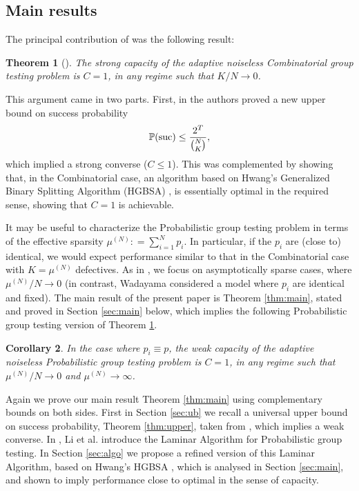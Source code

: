 \documentclass[conference]{IEEEtran}
\newtheorem{theorem}{Theorem}[section]
\newtheorem{corollary}[theorem]{Corollary}
\newcommand{\pr}{{\mathbb{P}}}
\newcommand{\suc}{{\rm suc}}
\begin{document}
\subsection{Main results}

The principal contribution of \cite[Theorem 1.2]{johnsonc10} was the following result:
%
\begin{theorem}[\cite{johnsonc10}] \label{thm:mainold}
The strong capacity of the adaptive noiseless Combinatorial group testing problem
  is  $C = 1$,
  in any regime such that $K/N \rightarrow 0$.
\end{theorem}
%
This argument came in two parts. First, in \cite[Theorem 3.1]{johnsonc10} the authors  proved a new
upper bound on success probability 
\begin{equation} \label{eq:bja} \pr(\suc) \leq \frac{2^T}{\binom{N}{K}}, \end{equation} which implied a strong converse ($C \leq 1$). This was complemented 
by 
showing that, in the Combinatorial case, an algorithm based on 
Hwang's Generalized Binary Splitting Algorithm (HGBSA) \cite{hwang}, \cite{du} is essentially optimal in the required sense,
showing that $C=1$ is achievable.


It may be useful to characterize the Probabilistic group testing problem in 
terms of the effective sparsity $\mu^{(N)}: = \sum_{i=1}^N p_i$. In particular, if the $p_i$ are (close to) identical, we would expect performance similar to that in the Combinatorial
case with $K = \mu^{(N)}$ defectives. As in \cite{johnsonc10}, we  focus on asymptotically sparse cases, where $\mu^{(N)}/N \rightarrow 0$ (in contrast, Wadayama
\cite{wadayama} considered a model where $p_i$ are identical and fixed).
The main result of the present paper is Theorem \ref{thm:main}, stated and proved in Section \ref{sec:main} below, which implies the 
following  Probabilistic group testing version of Theorem \ref{thm:mainold}.
\begin{corollary} \label{cor:main}
 In the case where $p_i \equiv p$, the weak capacity of the adaptive noiseless Probabilistic group testing problem
  is  $C = 1$, in any regime such that $\mu^{(N)}/N \rightarrow 0$ and $\mu^{(N)} \rightarrow \infty$.
  \end{corollary}



Again we prove our main result Theorem \ref{thm:main} using complementary bounds on both sides. First in Section \ref{sec:ub} we recall
 a universal upper bound on success probability, Theorem \ref{thm:upper}, taken from
\cite{li5}, which implies a weak converse.   In \cite{li5}, Li et al. introduce
the Laminar Algorithm for Probabilistic group testing.  
In Section \ref{sec:algo} we propose a refined version of this Laminar Algorithm, based on Hwang's HGBSA \cite{hwang}, which is
analysed in Section \ref{sec:main}, and shown to imply performance close to optimal in the sense of capacity.
\end{document}
